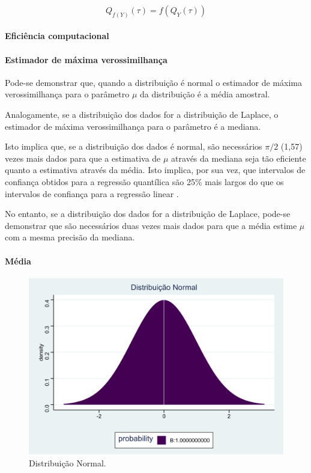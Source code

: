 \documentclass[a4paper, 12pt]{article}
\let\oldparagraph\paragraph
\renewcommand{\paragraph}[1]{\oldparagraph{#1}\mbox{}}
\begin{document}
\[Q_{f(Y)}(\tau) = f(Q_Y(\tau))\]

\hypertarget{eficiencia-computacional}{%
\paragraph{Eficiência computacional}\label{eficiencia-computacional}}

\hypertarget{estimador-de-maxima-verossimilhanca}{%
\paragraph{Estimador de máxima
verossimilhança}\label{estimador-de-maxima-verossimilhanca}}

Pode-se demonstrar que, quando a distribuição é normal o estimador de
máxima verossimilhança para o parâmetro \(\mu\) da distribuição é a
média amostral.

Analogamente, se a distribuição dos dados for a distribuição de Laplace,
o estimador de máxima verossimilhança para o parâmetro é a mediana.

Isto implica que, se a distribuição dos dados é normal, são necessários
\(\pi/2\) (1,57) vezes mais dados para que a estimativa de \(\mu\)
através da mediana seja tão eficiente quanto a estimativa através da
média. Isto implica, por sua vez, que intervalos de confiança obtidos
para a regressão quantílica são 25\% mais largos do que os intervalos de
confiança para a regressão linear
\autocites[354]{koenker2000}[92]{dasGupta}.

No entanto, se a distribuição dos dados for a distribuição de Laplace,
pode-se demonstrar que são necessários duas vezes mais dados para que a
média estime \(\mu\) com a mesma precisão da mediana.

\hypertarget{media}{%
\paragraph{Média}\label{media}}

\begin{figure}[H]

{\centering \includegraphics[width=0.7\linewidth]{images/dist_normal-1} 

}

\caption{Distribuição Normal.}\label{fig:dist_normal}
\end{figure}
\end{document}
